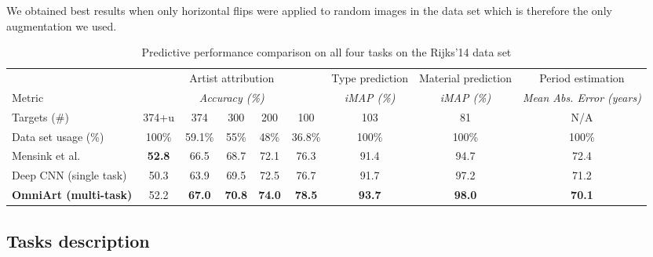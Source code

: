 \documentclass[sigconf]{acmart}
\begin{document}
We obtained best results when only horizontal flips were applied to random images in the data set which is therefore the only augmentation we used. 

\begin{table*}[]
\centering
\caption{Predictive performance comparison on all four tasks on the Rijks'14 data set}
\label{tab:rijks14_perf}
\begin{tabular}{lcccccccc}
    \toprule
                           & \multicolumn{5}{c}{Artist attribution}                                                    & Type prediction      & Material prediction      & Period estimation                   \\
Metric                     & \multicolumn{5}{c}{\textit{Accuracy (\%)}}                                                & \textit{iMAP (\%)}   & \textit{iMAP (\%)}       & \textit{Mean Abs. Error (years)}    \\\midrule
Targets (\#)               & 374+u          & 374               & 300             & 200             & 100              & 103                  & 81                       & N/A                             \\
Data set usage (\%)         & 100\%          & 59.1\%            & 55\%            & 48\%            & 36.8\%          & 100\%                & 100\%                    & 100\%                               \\\midrule

Mensink et al.              & \textbf{52.8}  & 66.5              & 68.7            & 72.1            & 76.3            & 91.4                 & 94.7                     & 72.4                                \\
Deep CNN (single task)     & 50.3           & 63.9              & 69.5            & 72.5            & 76.7             & 91.7                 & 97.2                     & 71.2                                \\
\textbf{OmniArt  (multi-task)}      & 52.2           & \textbf{67.0}     & \textbf{70.8}   & \textbf{74.0}   & \textbf{78.5}    & \textbf{93.7}        & \textbf{98.0}            & \textbf{70.1}                   \\
                                                                                                              \bottomrule
\end{tabular}
\end{table*}\subsection{Tasks description}
\end{document}
